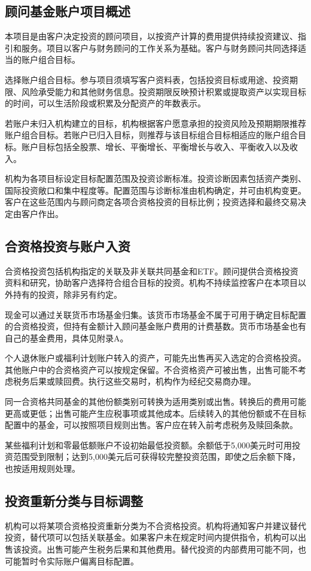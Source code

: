 \documentclass[UTF8,fontset=none,11pt,a4paper]{ctexart}
\begin{document}
\subsection*{顾问基金账户项目概述}
本项目是由客户决定投资的顾问项目，以按资产计算的费用提供持续投资建议、指引和服务。项目以客户与财务顾问的工作关系为基础。客户与财务顾问共同选择适当的账户组合目标。


选择账户组合目标。参与项目须填写客户资料表，包括投资目标或用途、投资期限、风险承受能力和其他财务信息。投资期限反映预计积累或提取资产以实现目标的时间，可以生活阶段或积累及分配资产的年数表示。


若账户未归入机构建立的目标，机构根据客户愿意承担的投资风险及预期期限推荐账户组合目标。若账户已归入目标，则推荐与该目标组合目标相适应的账户组合目标。账户目标包括全股票、增长、平衡增长、平衡增长与收入、平衡收入以及收入。


机构为各项目标设定目标配置范围及投资诊断标准。投资诊断因素包括资产类别、国际投资敞口和集中程度等。配置范围与诊断标准由机构确定，并可由机构变更。客户在这些范围内与顾问商定各项合资格投资的目标比例；投资选择和最终交易决定由客户作出。


\subsection*{合资格投资与账户入资}
合资格投资包括机构指定的关联及非关联共同基金和ETF。顾问提供合资格投资资料和研究，协助客户选择符合组合目标的投资。机构不持续监控客户在本项目以外持有的投资，除非另有约定。


现金可以通过关联货币市场基金归集。该货币市场基金不属于可用于确定目标配置的合资格投资，但持有金额计入顾问基金账户费用的计费基数。货币市场基金也有自己的基金费用，具体见附录A。


个人退休账户或福利计划账户转入的资产，可能先出售再买入选定的合资格投资。其他账户中的合资格资产可以按规定保留。不合资格资产可被出售，出售可能不考虑税务后果或赎回费。执行这些交易时，机构作为经纪交易商办理。


同一合资格共同基金的其他份额类别可转换为适用类别或出售。转换后的费用可能更高或更低；出售可能产生应税事项或其他成本。后续转入的其他份额或不在目标配置中的基金，可以按照项目规则出售。客户应在转入前考虑税务及赎回条款。


某些福利计划和零最低额账户不设初始最低投资额。余额低于5,000美元时可用投资范围受到限制；达到5,000美元后可获得较完整投资范围，即使之后余额下降，也按适用规则处理。


\subsection*{投资重新分类与目标调整}
机构可以将某项合资格投资重新分类为不合资格投资。机构将通知客户并建议替代投资，替代项可以包括关联基金。如果客户未在规定时间内提供指令，机构可以出售该投资。出售可能产生税务后果和其他费用。替代投资的内部费用可能不同，也可能暂时令实际账户偏离目标配置。
\end{document}
